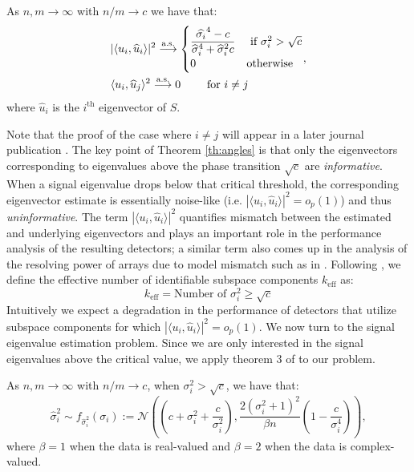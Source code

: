 \begin{Th}\label{th:angles}
As $n,m \longrightarrow \infty$ with $n/m \to c$ we have that:
\begin{equation*}
\begin{aligned}
&|\langle u_i,\widehat{u}_i\rangle|^2\overset{\textrm{a.s.}}{\longrightarrow}
\begin{cases}
\dfrac{\widehat{\sigma_i}^4-c}{\widehat{\sigma}_{i}^4+\widehat{\sigma}_{i}^2c} & \text{ if } \sigma_{i}^2>\sqrt{c}\\
0 & \textrm{otherwise}\\
\end{cases}\\
&\langle u_i,\widehat{u}_j\rangle ^2\overset{\textrm{a.s.}}{\longrightarrow} 0 \qquad \textrm{ for } i \neq j\\
\end{aligned},
\end{equation*}
where $\widehat{u}_i$ is the $i^{\text{th}}$ eigenvector of $S$.
\end{Th}

Note that the proof of the case where $i\neq j$ will appear in a later journal publication \cite{asendorf}. The key point of Theorem \ref{th:angles} is that only the eigenvectors corresponding to eigenvalues above the phase transition $\sqrt{c}$ are \textit{informative}. When a signal eigenvalue drops below that critical threshold, the corresponding eigenvector estimate is essentially noise-like  (i.e. $|\langle u_i,\widehat{u}_i\rangle|^2=o_{p}(1)$) and thus \textit{uninformative}. The term $|\langle u_i,\widehat{u}_i\rangle|^2$ quantifies mismatch between the estimated and underlying eigenvectors and plays an important role in the performance analysis of the resulting detectors; a similar term also comes up in the analysis of the resolving power of arrays due to model mismatch such as in \cite{cox1973resolving}. Following \cite{nadakuditi2008sample}, we define the effective number of identifiable subspace components $k_\text{eff}$ as:
\begin{equation}\label{eq:keff}
\boxed{k_\text{eff} = \text{Number of } \sigma_i^2\geq\sqrt{c}}
\end{equation}
Intuitively we expect a degradation in the performance of detectors  that utilize subspace components for which $|\langle u_i,\widehat{u}_i\rangle|^2=o_{p}(1)$.  We now turn to the signal eigenvalue estimation problem. Since we are only interested in the signal eigenvalues above the critical value, we apply theorem 3 of \cite{paul2007asymptotics} to our problem.

\begin{Th}\label{th:eigenvalues}
As $n,m \longrightarrow \infty$ with $n/m \to c$, when $\sigma_i^2 > \sqrt{c}$, we have that:
\begin{equation*}
\widehat{\sigma}_i^2\sim f_{\widehat{\sigma}_i^2}(\sigma_i) := \mathcal{N}\left(\left(c+\sigma_i^2+\frac{c}{\sigma_i^2}\right),\frac{2\left(\sigma_i^2+1\right)^2}{\beta n}\left(1-\frac{c}{\sigma_i^4}\right)\right),
\end{equation*}
where $\beta = 1$ when the data is real-valued and $\beta = 2$ when the data is complex-valued.
\end{Th}

